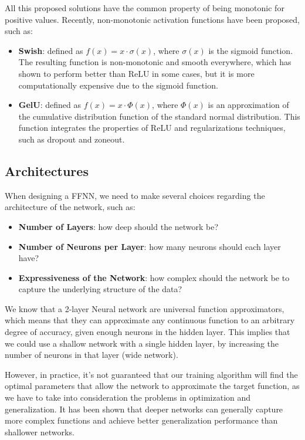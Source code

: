 All this proposed solutions have the common property of being monotonic for positive values. Recently,
non-monotonic activation functions have been proposed, such as:
\begin{itemize}
    \item \textbf{Swish}: defined as $f(x) = x \cdot \sigma(x)$, where $\sigma(x)$ is the sigmoid function.
    The resulting function is non-monotonic and smooth everywhere, which has shown to perform better than ReLU in some cases, but 
    it is more computationally expensive due to the sigmoid function.
    \item \textbf{GelU}: defined as $f(x) = x \cdot \Phi(x)$, where $\Phi(x)$ is an approximation of the cumulative 
    distribution function of the standard normal distribution.
    This function integrates the properties of ReLU and regularizations techniques, such as dropout and zoneout.
\end{itemize}

\subsection{Architectures}
When designing a FFNN, we need to make several choices regarding the architecture of the network, such as:
\begin{itemize}
    \item \textbf{Number of Layers}: how deep should the network be?
    \item \textbf{Number of Neurons per Layer}: how many neurons should each layer have?
    \item \textbf{Expressiveness of the Network}: how complex should the network be to capture the underlying structure of the data?
\end{itemize}
We know that a 2-layer Neural network are universal function approximators, which means that they can approximate any continuous 
function to an arbitrary degree of accuracy, given enough neurons in the hidden layer.
This implies that we could use a shallow network with a single hidden layer, by increasing the number of neurons in that layer (wide network).

However, in practice, it's not guaranteed that our training algorithm will find the optimal parameters that allow the network to approximate the target function, 
as we have to take into consideration the problems in optimization and generalization.
It has been shown that deeper networks can generally capture more complex functions and achieve better generalization performance than shallower networks.

